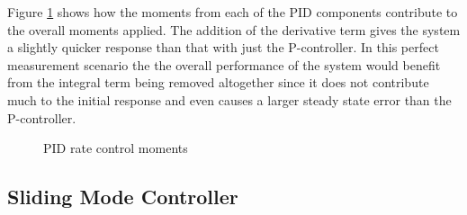 Figure \ref{fig:PIDRateControlMoments} shows how the moments from each of the PID components contribute to the overall moments applied.  The addition of the derivative term gives the system a slightly quicker response than that with just the P-controller.   In this perfect measurement scenario the the overall performance of the system would benefit from the integral term being removed altogether since it does not contribute much to the initial response and even causes a larger steady state error than the P-controller.
\begin{figure}[H]
  \centerline{}
  \caption{PID rate control moments}
  \label{fig:PIDRateControlMoments}
\end{figure}

\subsection{Sliding Mode Controller}
\label{subsec:SlidingModeController}

